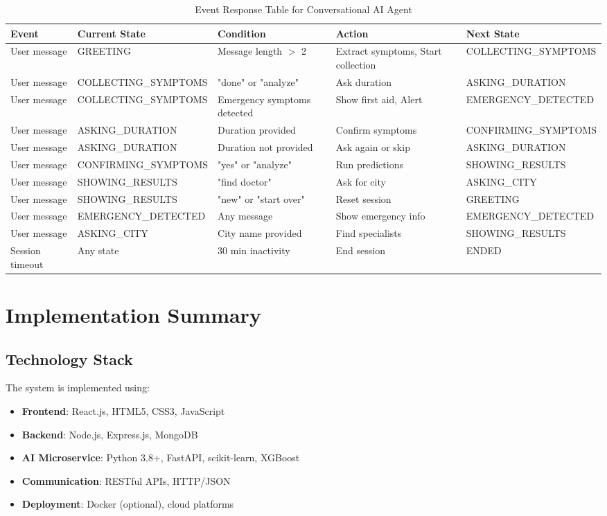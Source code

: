 \documentclass[12pt,a4paper]{article}
\begin{document}
\begin{table}[H]
\centering
\caption{Event Response Table for Conversational AI Agent}
\label{tab:events}
\small
\begin{tabularx}{\textwidth}{|X|X|X|X|X|}
\hline
\textbf{Event} & \textbf{Current State} & \textbf{Condition} & \textbf{Action} & \textbf{Next State} \\
\hline
User message & GREETING & Message length $>$ 2 & Extract symptoms, Start collection & COLLECTING\_SYMPTOMS \\
\hline
User message & COLLECTING\_SYMPTOMS & "done" or "analyze" & Ask duration & ASKING\_DURATION \\
\hline
User message & COLLECTING\_SYMPTOMS & Emergency symptoms detected & Show first aid, Alert & EMERGENCY\_DETECTED \\
\hline
User message & ASKING\_DURATION & Duration provided & Confirm symptoms & CONFIRMING\_SYMPTOMS \\
\hline
User message & ASKING\_DURATION & Duration not provided & Ask again or skip & ASKING\_DURATION \\
\hline
User message & CONFIRMING\_SYMPTOMS & "yes" or "analyze" & Run predictions & SHOWING\_RESULTS \\
\hline
User message & SHOWING\_RESULTS & "find doctor" & Ask for city & ASKING\_CITY \\
\hline
User message & SHOWING\_RESULTS & "new" or "start over" & Reset session & GREETING \\
\hline
User message & EMERGENCY\_DETECTED & Any message & Show emergency info & EMERGENCY\_DETECTED \\
\hline
User message & ASKING\_CITY & City name provided & Find specialists & SHOWING\_RESULTS \\
\hline
Session timeout & Any state & 30 min inactivity & End session & ENDED \\
\hline
\end{tabularx}
\end{table}

\section{Implementation Summary}

\subsection{Technology Stack}
The system is implemented using:

\begin{itemize}
    \item \textbf{Frontend}: React.js, HTML5, CSS3, JavaScript
    \item \textbf{Backend}: Node.js, Express.js, MongoDB
    \item \textbf{AI Microservice}: Python 3.8+, FastAPI, scikit-learn, XGBoost
    \item \textbf{Communication}: RESTful APIs, HTTP/JSON
    \item \textbf{Deployment}: Docker (optional), cloud platforms
\end{itemize}
\end{document}

